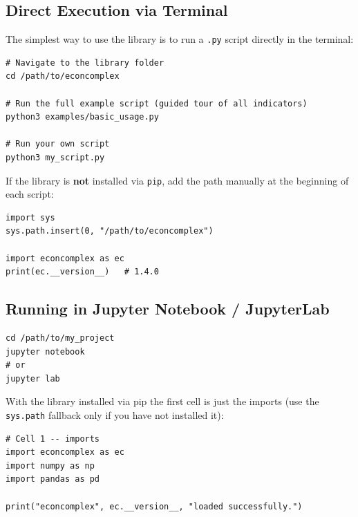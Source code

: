 \documentclass[12pt, a4paper]{article}
\begin{document}
\subsection{Direct Execution via Terminal}

The simplest way to use the library is to run a \texttt{.py} script
directly in the terminal:

\begin{lstlisting}[style=bashstyle,
  caption={Running scripts in the terminal}]
# Navigate to the library folder
cd /path/to/econcomplex

# Run the full example script (guided tour of all indicators)
python3 examples/basic_usage.py

# Run your own script
python3 my_script.py
\end{lstlisting}

If the library is \textbf{not} installed via \texttt{pip},
add the path manually at the beginning of each script:

\begin{lstlisting}[caption={Adding path to sys.path (without pip install)}]
import sys
sys.path.insert(0, "/path/to/econcomplex")

import econcomplex as ec
print(ec.__version__)   # 1.4.0
\end{lstlisting}

\subsection{Running in Jupyter Notebook / JupyterLab}

\begin{lstlisting}[style=bashstyle,
  caption={Opening Jupyter from your project folder}]
cd /path/to/my_project
jupyter notebook
# or
jupyter lab
\end{lstlisting}

With the library installed via pip the first cell is just the imports
(use the \texttt{sys.path} fallback only if you have not installed it):

\begin{lstlisting}[caption={Configuration cell in Jupyter}]
# Cell 1 -- imports
import econcomplex as ec
import numpy as np
import pandas as pd

print("econcomplex", ec.__version__, "loaded successfully.")
\end{lstlisting}
\end{document}
